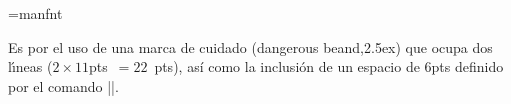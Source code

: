 
\font\manual=manfnt
\overfullrule=0pt

\bigskip


\bigskip

\respuestaS Es por el uso de una marca de cuidado (dangerous
beand,\raise2.5ex\hbox{\manual{}\/}) que ocupa dos l\'{\i}neas
\hbox{($2 \times 11$pts $ = 22$ pts)}, as\'i como la inclusi\'on de un
espacio de $6$pts definido por el comando |\medskip|.

\bye

